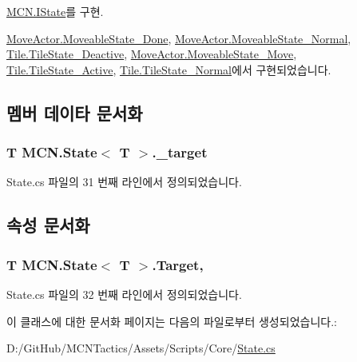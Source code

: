 \hyperlink{interface_m_c_n_1_1_i_state_a6345ae1392685098bacef30ddf80362e}{M\+C\+N.\+I\+State}를 구현.



\hyperlink{class_move_actor_1_1_moveable_state___done_a5fa0f074185fecf42c07697b3bf9ab2c}{Move\+Actor.\+Moveable\+State\+\_\+\+Done}, \hyperlink{class_move_actor_1_1_moveable_state___normal_a687176bd566ec3493d38fb51d6f5de5f}{Move\+Actor.\+Moveable\+State\+\_\+\+Normal}, \hyperlink{class_tile_1_1_tile_state___deactive_a806c5dbc5eb43903ad41d448f3d25c61}{Tile.\+Tile\+State\+\_\+\+Deactive}, \hyperlink{class_move_actor_1_1_moveable_state___move_a81659255954f8ff95fcac87a0cfd3c73}{Move\+Actor.\+Moveable\+State\+\_\+\+Move}, \hyperlink{class_tile_1_1_tile_state___active_ab53c7c818d65122d6d36c9681ca53bf9}{Tile.\+Tile\+State\+\_\+\+Active}, \hyperlink{class_tile_1_1_tile_state___normal_acf613382b6ddeff2fcc226d8caeb0b53}{Tile.\+Tile\+State\+\_\+\+Normal}에서 구현되었습니다.



\subsection{멤버 데이타 문서화}
\subsubsection[{\texorpdfstring{\+\_\+target}{_target}}]{\setlength{\rightskip}{0pt plus 5cm}T {\bf M\+C\+N.\+State}$<$ T $>$.\+\_\+target\hspace{0.3cm}{\ttfamily [private]}}\hypertarget{class_m_c_n_1_1_state_ab759357c7d076cf62dd0016b743d762e}{}\label{class_m_c_n_1_1_state_ab759357c7d076cf62dd0016b743d762e}


State.\+cs 파일의 31 번째 라인에서 정의되었습니다.



\subsection{속성 문서화}
\subsubsection[{\texorpdfstring{Target}{Target}}]{\setlength{\rightskip}{0pt plus 5cm}T {\bf M\+C\+N.\+State}$<$ T $>$.Target\hspace{0.3cm}{\ttfamily [get]}, {\ttfamily [protected]}}\hypertarget{class_m_c_n_1_1_state_a93ba2fd920292031bd6e65b1dc505cb3}{}\label{class_m_c_n_1_1_state_a93ba2fd920292031bd6e65b1dc505cb3}


State.\+cs 파일의 32 번째 라인에서 정의되었습니다.



이 클래스에 대한 문서화 페이지는 다음의 파일로부터 생성되었습니다.\+:\begin{DoxyCompactItemize}
\item 
D\+:/\+Git\+Hub/\+M\+C\+N\+Tactics/\+Assets/\+Scripts/\+Core/\hyperlink{_state_8cs}{State.\+cs}\end{DoxyCompactItemize}
